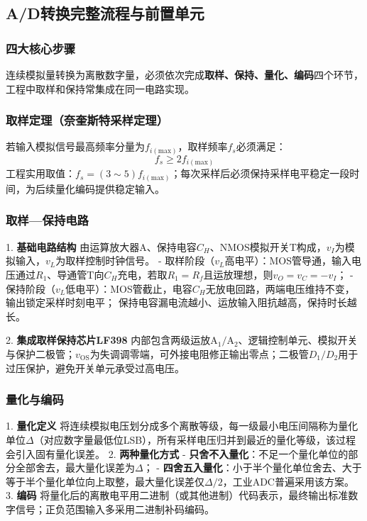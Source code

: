 \subsection{A/D转换完整流程与前置单元}
\subsubsection{四大核心步骤}
连续模拟量转换为离散数字量，必须依次完成\textbf{取样、保持、量化、编码}四个环节，工程中取样和保持常集成在同一电路实现。

\subsubsection{取样定理（奈奎斯特采样定理）}
若输入模拟信号最高频率分量为$f_{i(\text{max})}$，取样频率$f_s$必须满足：
\[
f_s \ge 2f_{i(\text{max})}
\]
工程实用取值：$f_s=(3\sim5)f_{i(\text{max})}$；每次采样后必须保持采样电平稳定一段时间，为后续量化编码提供稳定输入。

\subsubsection{取样—保持电路}
1. \textbf{基础电路结构}
由运算放大器$\text{A}$、保持电容$C_H$、NMOS模拟开关$\text{T}$构成，$v_I$为模拟输入，$v_L$为取样控制时钟信号。
- 取样阶段（$v_L$高电平）：MOS管导通，输入电压通过$R_1$、导通管$\text{T}$向$C_H$充电，若取$R_1=R_f$且运放理想，则$v_O=v_C=-v_I$；
- 保持阶段（$v_L$低电平）：MOS管截止，电容$C_H$无放电回路，两端电压维持不变，输出锁定采样时刻电平；
保持电容漏电流越小、运放输入阻抗越高，保持时长越长。

2. \textbf{集成取样保持芯片LF398}
内部包含两级运放$\text{A}_1/\text{A}_2$、逻辑控制单元、模拟开关与保护二极管；$v_\text{OS}$为失调调零端，可外接电阻修正输出零点；二极管$D_1/D_2$用于过压保护，避免开关单元承受过高电压。

\subsubsection{量化与编码}
1. \textbf{量化定义}
将连续模拟电压划分成多个离散等级，每一级最小电压间隔称为量化单位$\Delta$（对应数字量最低位LSB），所有采样电压归并到最近的量化等级，该过程会引入固有量化误差。
2. \textbf{两种量化方式}
- \textbf{只舍不入量化}：不足一个量化单位的部分全部舍去，最大量化误差为$\Delta$；
- \textbf{四舍五入量化}：小于半个量化单位舍去、大于等于半个量化单位向上取整，最大量化误差仅$\Delta/2$，工业ADC普遍采用该方案。
3. \textbf{编码}
将量化后的离散电平用二进制（或其他进制）代码表示，最终输出标准数字信号；正负范围输入多采用二进制补码编码。

